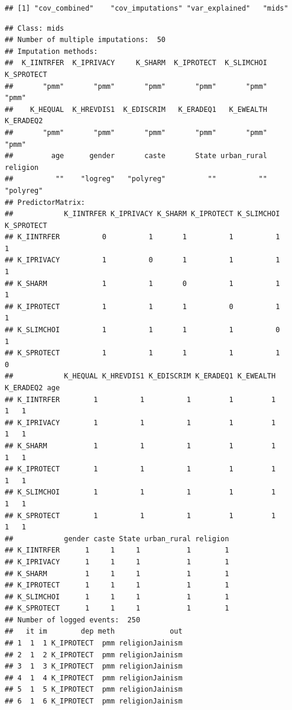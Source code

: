 \documentclass[
]{article}
\begin{document}
\begin{verbatim}
## [1] "cov_combined"    "cov_imputations" "var_explained"   "mids"
\end{verbatim}

\begin{verbatim}
## Class: mids
## Number of multiple imputations:  50 
## Imputation methods:
##  K_IINTRFER  K_IPRIVACY     K_SHARM  K_IPROTECT  K_SLIMCHOI  K_SPROTECT 
##       "pmm"       "pmm"       "pmm"       "pmm"       "pmm"       "pmm" 
##    K_HEQUAL  K_HREVDIS1  K_EDISCRIM   K_ERADEQ1   K_EWEALTH   K_ERADEQ2 
##       "pmm"       "pmm"       "pmm"       "pmm"       "pmm"       "pmm" 
##         age      gender       caste       State urban_rural    religion 
##          ""    "logreg"   "polyreg"          ""          ""   "polyreg" 
## PredictorMatrix:
##            K_IINTRFER K_IPRIVACY K_SHARM K_IPROTECT K_SLIMCHOI K_SPROTECT
## K_IINTRFER          0          1       1          1          1          1
## K_IPRIVACY          1          0       1          1          1          1
## K_SHARM             1          1       0          1          1          1
## K_IPROTECT          1          1       1          0          1          1
## K_SLIMCHOI          1          1       1          1          0          1
## K_SPROTECT          1          1       1          1          1          0
##            K_HEQUAL K_HREVDIS1 K_EDISCRIM K_ERADEQ1 K_EWEALTH K_ERADEQ2 age
## K_IINTRFER        1          1          1         1         1         1   1
## K_IPRIVACY        1          1          1         1         1         1   1
## K_SHARM           1          1          1         1         1         1   1
## K_IPROTECT        1          1          1         1         1         1   1
## K_SLIMCHOI        1          1          1         1         1         1   1
## K_SPROTECT        1          1          1         1         1         1   1
##            gender caste State urban_rural religion
## K_IINTRFER      1     1     1           1        1
## K_IPRIVACY      1     1     1           1        1
## K_SHARM         1     1     1           1        1
## K_IPROTECT      1     1     1           1        1
## K_SLIMCHOI      1     1     1           1        1
## K_SPROTECT      1     1     1           1        1
## Number of logged events:  250 
##   it im        dep meth             out
## 1  1  1 K_IPROTECT  pmm religionJainism
## 2  1  2 K_IPROTECT  pmm religionJainism
## 3  1  3 K_IPROTECT  pmm religionJainism
## 4  1  4 K_IPROTECT  pmm religionJainism
## 5  1  5 K_IPROTECT  pmm religionJainism
## 6  1  6 K_IPROTECT  pmm religionJainism
\end{verbatim}
\end{document}
